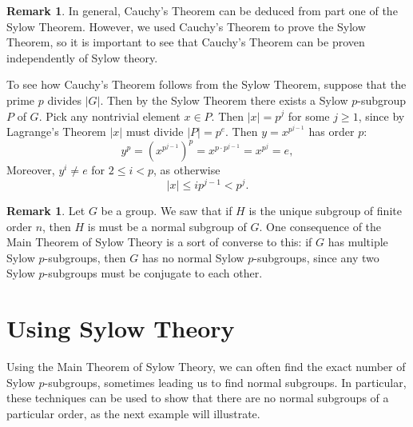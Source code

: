 \documentclass[12pt]{report}
\numberwithin{equation}{section}
\numberwithin{theorem}{chapter}
\theoremstyle{definition}
\newtheorem*{basic properties}{Basic Properties}
\newtheorem*{Important Remark}{Important Remark}
\newtheorem{remark}[theorem]{Remark}
\begin{document}
\begin{remark} 
In general, Cauchy's Theorem can be deduced from part one of the Sylow Theorem. However, we used Cauchy's Theorem to prove the Sylow Theorem, so it is important to see that Cauchy's Theorem can be proven independently of Sylow theory.

To see how Cauchy's Theorem follows from the Sylow Theorem, suppose that the prime $p$ divides $|G|$. Then by the Sylow Theorem there exists a Sylow $p$-subgroup $P$ of $G$. Pick any nontrivial element $x \in P$. Then $|x| = p^j$ for some $j \geqslant 1$, since  by Lagrange's Theorem $|x|$ must divide $|P| = p^e$. Then $y = x^{p^{j-1}}$ has order $p$:
$$y^p = \left( x^{p^{j-1}} \right)^p  =x^{p \cdot p^{j-1}} = x^{p^{j}} = e,$$
 Moreover, $y^i \neq e$ for $2 \leqslant i < p$, as otherwise 
 $$|x| \leqslant ip^{j-1} < p^j.$$

\end{remark}


\begin{remark}
Let $G$ be a group. We saw that if $H$ is the unique subgroup of finite order $n$, then $H$ is must be a normal subgroup of $G$. 
One consequence of the Main Theorem of Sylow Theory is a sort of converse to this: if $G$ has multiple Sylow $p$-subgroups, then $G$ has no normal Sylow $p$-subgroups, since any two Sylow $p$-subgroups must be conjugate to each other.
\end{remark}



\section{Using Sylow Theory}


Using the Main Theorem of Sylow Theory, we can often find the exact number of Sylow $p$-subgroups, sometimes leading us to find normal subgroups. In particular, these techniques can be used to show that there are no normal subgroups of a particular order, as the next example will illustrate.
\end{document}
